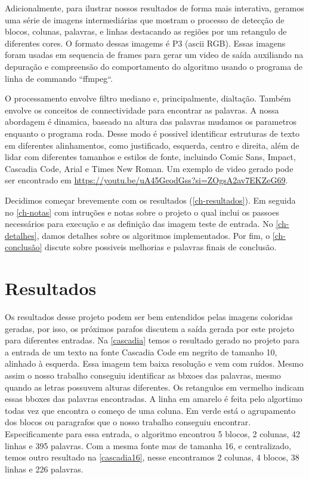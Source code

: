 \documentclass[english, 
               brazil, 
               bsc] %
               {dcomp-abntex2}
\begin{document}
Adicionalmente, para ilustrar nossos resultados de forma mais interativa, geramos uma série de imagens intermediárias que mostram o processo de detecção de blocos, colunas, palavras, e linhas destacando as regiões por um retangulo de diferentes cores. O formato dessas imagems é P3 (ascii RGB). Essas imagens foram usadas em sequencia de frames para gerar um video de saída auxiliando na depuração e compreensão do comportamento do algoritmo usando o programa de linha de commando ``ffmpeg``.

O processamento envolve filtro mediano e, principalmente, dialtação. Também envolve os conceitos de connectividade para encontrar as palavras. A nossa abordagem é dinamica, baseado na altura das palavras mudamos os parametros enquanto o programa roda. Desse modo é possivel identificar estruturas de texto em diferentes alinhamentos, como justificado, esquerda, centro e direita, além de lidar com diferentes tamanhos e estilos de fonte, incluindo Comic Sans, Impact, Cascadia Code, Arial e Times New Roman. Um exemplo de video gerado pode ser encontrado em \url{https://youtu.be/uA45GeodGss?si=ZOgsA2av7EKZeG69}.

Decidimos começar brevemente com os resultados (\autoref{ch-resultados}). Em seguida no \autoref{ch-notas} com intruções e notas sobre o projeto o qual inclui os passoes necessários para execução e as definição das imagem teste de entrada. No \autoref{ch-detalhes}, damos detalhes sobre os algoritmos implementados. Por fim, o \autoref{ch-conclusão} discute sobre possiveis melhorias e palavras finais de conclusão.


\chapter{Resultados} \label{ch-resultados}
 Os resultados desse projeto podem ser bem entendidos pelas imagens coloridas geradas, por isso, os próximos parafos discutem a saída gerada por este projeto para diferentes entradas. Na \autoref{cascadia} temos o resultado gerado no projeto para a entrada de um texto na fonte Cascadia Code em negrito de tamanho 10, alinhado à esquerda. Essa imagem tem baixa resolução e vem com ruídos. Mesmo assim o nosso trabalho conseguiu identificar as bbxoes das palavras, mesmo quando as letras possuvem alturas diferentes. Os retangulos em vermelho indicam essas bboxes das palavras encontradas. A linha em amarelo é feita pelo algortimo todas vez que encontra o começo de  uma coluna. Em verde está o agrupamento dos blocos ou paragrafos que o nosso trabalho conseguiu encontrar. Especificamente para essa entrada, o algoritmo encontrou 5 blocos, 2 colunas, 42 linhas e 395 palavras. Com a mesma fonte mas de tamanha 16, e centralizado, temos outro resultado na \autoref{cascadia16}, nesse encontramos 2 colunas, 4 blocos, 38 linhas e 226 palavras.
\end{document}
